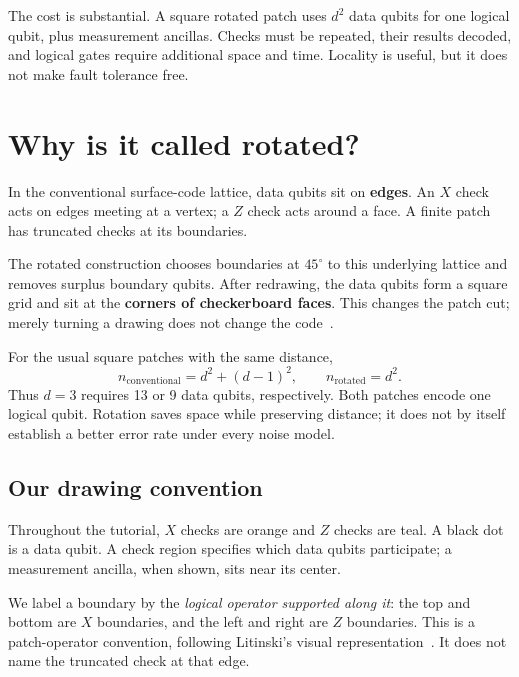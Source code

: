 \documentclass[11pt,a4paper]{article}
\begin{document}
The cost is substantial. A square rotated patch uses $d^2$ data qubits for one logical qubit, plus measurement ancillas. Checks must be repeated, their results decoded, and logical gates require additional space and time. Locality is useful, but it does not make fault tolerance free.

\newpage
\section{Why is it called rotated?}

In the conventional surface-code lattice, data qubits sit on \textbf{edges}. An $X$ check acts on edges meeting at a vertex; a $Z$ check acts around a face. A finite patch has truncated checks at its boundaries.

The rotated construction chooses boundaries at $45^\circ$ to this underlying lattice and removes surplus boundary qubits. After redrawing, the data qubits form a square grid and sit at the \textbf{corners of checkerboard faces}. This changes the patch cut; merely turning a drawing does not change the code~\cite{horsman}.

\begin{center}
\layoutcomparison
{}
\end{center}

For the usual square patches with the same distance,
\[
n_{\mathrm{conventional}}=d^2+(d-1)^2,
\qquad n_{\mathrm{rotated}}=d^2.
\]
Thus $d=3$ requires 13 or 9 data qubits, respectively. Both patches encode one logical qubit. Rotation saves space while preserving distance; it does not by itself establish a better error rate under every noise model.

\subsection*{Our drawing convention}
Throughout the tutorial, \textcolor{xc}{$X$ checks are orange} and \textcolor{zc}{$Z$ checks are teal}. A black dot is a data qubit. A check region specifies which data qubits participate; a measurement ancilla, when shown, sits near its center.

We label a boundary by the \emph{logical operator supported along it}: the top and bottom are $X$ boundaries, and the left and right are $Z$ boundaries. This is a patch-operator convention, following Litinski's visual representation~\cite{litinski}. It does not name the truncated check at that edge.
\end{document}
